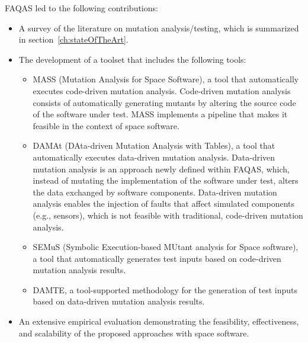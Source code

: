 FAQAS led to the following contributions:
\begin{itemize}
\item A survey of the literature on mutation analysis/testing, which is summarized in section~\ref{ch:stateOfTheArt}.
\item The development of a toolset that includes the following tools:
\begin{itemize}
\item MASS (Mutation Analysis for Space Software), a tool that automatically executes code-driven mutation analysis. Code-driven mutation analysis consists of automatically generating mutants by altering the source code of the software under test. MASS implements a pipeline that makes it feasible in the context of space software.
\item DAMAt (DAta-driven Mutation Analysis with Tables), a tool that automatically executes data-driven mutation analysis. Data-driven mutation analysis is an approach newly defined within FAQAS, which, instead of mutating the implementation of the software under test, alters the data exchanged by software components. Data-driven mutation analysis enables the injection of faults that affect simulated components (e.g., sensors), which is not feasible with traditional, code-driven mutation analysis.
\item SEMuS (Symbolic Execution-based MUtant analysis for Space software), a tool that automatically generates test inputs based on code-driven mutation analysis results.
\item DAMTE, a tool-supported methodology for the generation of test inputs based on data-driven mutation analysis results.
\end{itemize}
\item An extensive empirical evaluation demonstrating the feasibility, effectiveness, and scalability of the proposed approaches with space software.
%

\end{itemize}
